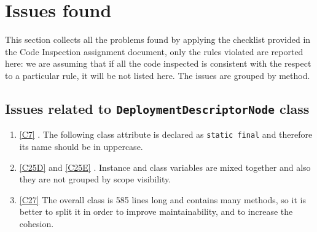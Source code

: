 \newpage
\section{Issues found}
\label{sec:issues}
This section collects all the problems found by applying the checklist provided in the Code Inspection assignment document, only the rules violated are reported here: we are assuming that if all the code inspected is consistent with the respect to a particular rule, it will be not listed here.
The issues are grouped by method.
\subsection{Issues related to \texttt{DeploymentDescriptorNode} class}
\begin{enumerate}
	\item \ref{C7} . The following class attribute is declared as \texttt{static final} and therefore its name should be in uppercase. 
	\item \ref{C25D}  and \ref {C25E} . Instance and class variables are mixed together and also they are not grouped by scope visibility. 
	\item \ref{C27} The overall class is 585 lines long and contains many methods, so it is better to split it in order to improve maintainability, and to increase the cohesion.
\end{enumerate}

